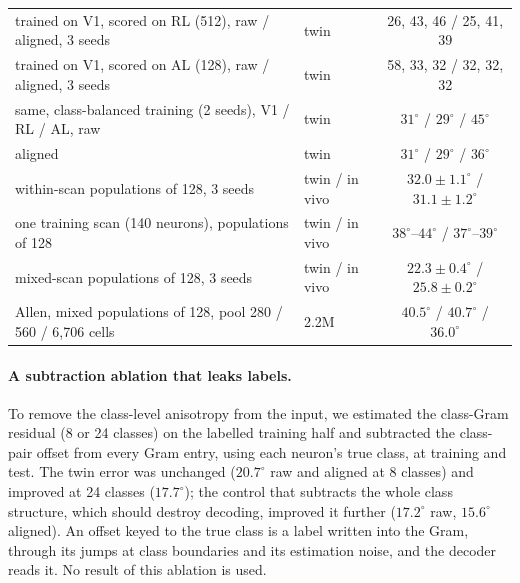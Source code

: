 \documentclass[11pt]{article}
\begin{document}
\begin{table}[htbp]
\begin{tabular}{llc}
    trained on V1, scored on RL (512), raw / aligned, 3 seeds & twin & 26, 43, 46 / 25, 41, 39 \\
    trained on V1, scored on AL (128), raw / aligned, 3 seeds & twin & 58, 33, 32 / 32, 32, 32 \\
    same, class-balanced training (2 seeds), V1 / RL / AL, raw & twin & $31^\circ$ / $29^\circ$ / $45^\circ$ \\
    \quad aligned & twin & $31^\circ$ / $29^\circ$ / $36^\circ$ \\
    within-scan populations of 128, 3 seeds & twin / in vivo & $32.0 \pm 1.1^\circ$ / $31.1 \pm 1.2^\circ$ \\
    one training scan (140 neurons), populations of 128 & twin / in vivo & $38^\circ$--$44^\circ$ / $37^\circ$--$39^\circ$ \\
    mixed-scan populations of 128, 3 seeds & twin / in vivo & $22.3 \pm 0.4^\circ$ / $25.8 \pm 0.2^\circ$ \\
    \midrule
    Allen, mixed populations of 128, pool 280 / 560 / 6,706 cells & 2.2M & $40.5^\circ$ / $40.7^\circ$ / $36.0^\circ$ \\
    \bottomrule
  \end{tabular}
\end{table}

\paragraph{A subtraction ablation that leaks labels.} To remove the class-level anisotropy from the input, we estimated the class-Gram residual (8 or 24 classes) on the labelled training half and subtracted the class-pair offset from every Gram entry, using each neuron's true class, at training and test. The twin error was unchanged ($20.7^\circ$ raw and aligned at 8 classes) and improved at 24 classes ($17.7^\circ$); the control that subtracts the whole class structure, which should destroy decoding, improved it further ($17.2^\circ$ raw, $15.6^\circ$ aligned). An offset keyed to the true class is a label written into the Gram, through its jumps at class boundaries and its estimation noise, and the decoder reads it. No result of this ablation is used.
\end{document}
